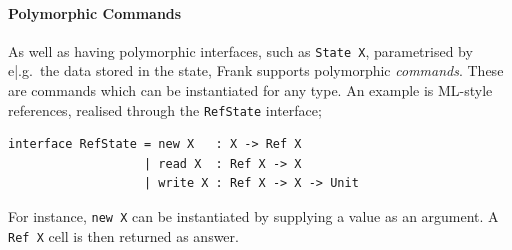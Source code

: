 \documentclass[msc,deptreport,cs]{infthesis} %
\newcommand{\code}[1]{\lstinline{#1}}
\begin{document}
 


\paragraph*{Polymorphic Commands}

As well as having polymorphic interfaces, such as \code{State X}, parametrised
by e|.g.~the data stored in the state, Frank supports polymorphic
\emph{commands}. These are commands which can be instantiated for any type. An
example is ML-style references, realised through the \code{RefState} interface;

\begin{lstlisting}
interface RefState = new X   : X -> Ref X
                   | read X  : Ref X -> X
                   | write X : Ref X -> X -> Unit
\end{lstlisting}

\noindent For instance, \code{new X} can be instantiated by supplying a value as
an argument. A \code{Ref X} cell is then returned as answer.
\end{document}

